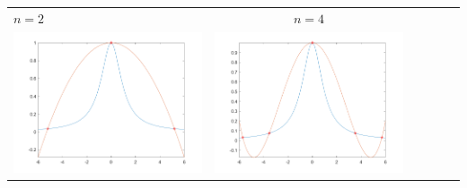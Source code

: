 \noindent\small\begin{tabular}{l*{5}{c}}
\hspace{3.5cm}\(n=2\) & \(n=4\) \\
\includegraphics[scale=0.5]{cap4/4_7/2.png} &  \includegraphics[scale=0.5]{cap4/4_7/4.png} \\


\end{tabular}
